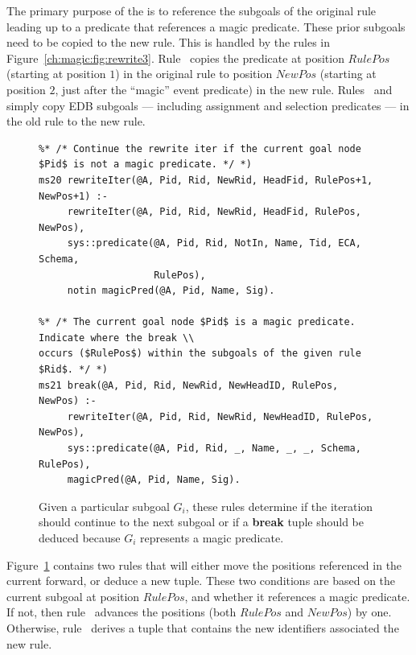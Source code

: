 The primary purpose of the  is to reference the subgoals of the
original rule leading up to a predicate that references a magic predicate.
These prior subgoals need to be copied to the new rule.  This is handled by the
rules in Figure~\ref{ch:magic:fig:rewrite3}.  Rule~ copies the
predicate at position $RulePos$ (starting at position $1$) in the original rule
to position $NewPos$ (starting at position $2$, just after the ``magic'' event
predicate) in the new rule.  Rules~ and  simply copy EDB
subgoals --- including assignment and selection predicates --- in the old rule
to the new rule.


\begin{figure}
\ssp
\centering
\begin{lstlisting}
%* /* Continue the rewrite iter if the current goal node $Pid$ is not a magic predicate. */ *)
ms20 rewriteIter(@A, Pid, Rid, NewRid, HeadFid, RulePos+1, NewPos+1) :-
     rewriteIter(@A, Pid, Rid, NewRid, HeadFid, RulePos, NewPos),
     sys::predicate(@A, Pid, Rid, NotIn, Name, Tid, ECA, Schema, 
                    RulePos),
     notin magicPred(@A, Pid, Name, Sig).

%* /* The current goal node $Pid$ is a magic predicate. Indicate where the break \\
occurs ($RulePos$) within the subgoals of the given rule $Rid$. */ *)
ms21 break(@A, Pid, Rid, NewRid, NewHeadID, RulePos, NewPos) :-
     rewriteIter(@A, Pid, Rid, NewRid, NewHeadID, RulePos, NewPos),
     sys::predicate(@A, Pid, Rid, _, Name, _, _, Schema, RulePos),
     magicPred(@A, Pid, Name, Sig).
\end{lstlisting}
\caption{\label{ch:magic:fig:rewrite4} Given a particular subgoal $G_i$, these rules determine
if the iteration should continue to the next subgoal or if a {\bf break} tuple should be
deduced because $G_i$ represents a magic predicate. }
\end{figure}

Figure~\ref{ch:magic:fig:rewrite4} contains two rules that will either move the
positions referenced in the current  forward, or deduce a new
 tuple.  These two conditions are based on the current subgoal at
position $RulePos$, and whether it references a magic predicate.  If not, then
rule~ advances the  positions (both $RulePos$ and
$NewPos$) by one.  Otherwise, rule~ derives a  tuple that
contains the new identifiers associated the new rule.

